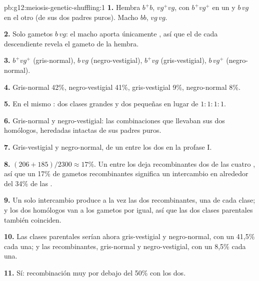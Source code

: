 \begin{solution}{pb:g12:meiosis-genetic-shuffling:1}
\textbf{1.} Hembra $b^+b$, $vg^+vg$, con $b^+vg^+$ en un  y
$b\,vg$ en el otro (de sus dos padres puros). Macho $bb$, $vg\,vg$.

\textbf{2.} Solo gametos $b\,vg$: el macho aporta únicamente 
, así que el  de cada descendiente revela el gameto de
la hembra.

\textbf{3.} $b^+vg^+$ (gris-normal), $b\,vg$ (negro-vestigial),
$b^+vg$ (gris-vestigial), $b\,vg^+$ (negro-normal).

\textbf{4.} Gris-normal 42\%, negro-vestigial 41\%, gris-vestigial
9\%, negro-normal 8\%.

\textbf{5.} En el mismo : dos clases grandes y dos pequeñas en
lugar de $1:1:1:1$.

\textbf{6.} Gris-normal y negro-vestigial: las combinaciones que
llevaban sus dos homólogos, heredadas intactas de sus padres puros.

\textbf{7.} Gris-vestigial y negro-normal, de un  entre
los dos  en la profase I.

\textbf{8.} $(206 + 185)/2300 \approx 17\%$. Un  entre
los  deja recombinantes dos de las cuatro , así que un
17\% de gametos recombinantes significa un intercambio en alrededor del
34\% de las .

\textbf{9.} Un solo intercambio produce a la vez las dos 
recombinantes, una de cada clase; y los dos homólogos van a los gametos
por igual, así que las dos clases parentales también coinciden.

\textbf{10.} Las clases parentales serían ahora gris-vestigial y
negro-normal, con un 41,5\% cada una; y las recombinantes, gris-normal
y negro-vestigial, con un 8,5\% cada una.

\textbf{11.} Sí: recombinación muy por debajo del 50\% con los dos.


\end{solution}
